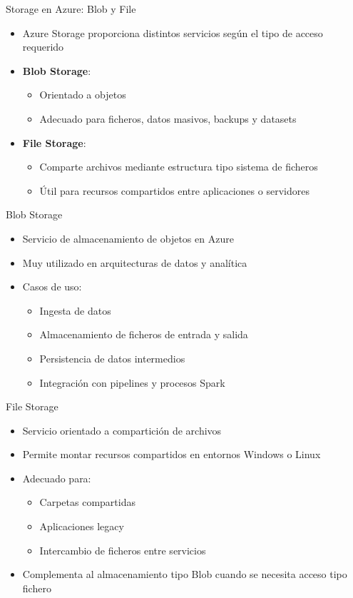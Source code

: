 \documentclass{beamer}
\begin{document}
\begin{frame}{Storage en Azure: Blob y File}
\begin{itemize}
    \item Azure Storage proporciona distintos servicios según el tipo de acceso requerido
    \item \textbf{Blob Storage}:
    \begin{itemize}
        \item Orientado a objetos
        \item Adecuado para ficheros, datos masivos, backups y datasets
    \end{itemize}
    \item \textbf{File Storage}:
    \begin{itemize}
        \item Comparte archivos mediante estructura tipo sistema de ficheros
        \item Útil para recursos compartidos entre aplicaciones o servidores
    \end{itemize}
\end{itemize}
\end{frame}

\begin{frame}{Blob Storage}
\begin{itemize}
    \item Servicio de almacenamiento de objetos en Azure
    \item Muy utilizado en arquitecturas de datos y analítica
    \item Casos de uso:
    \begin{itemize}
        \item Ingesta de datos
        \item Almacenamiento de ficheros de entrada y salida
        \item Persistencia de datos intermedios
        \item Integración con pipelines y procesos Spark
    \end{itemize}
\end{itemize}
\end{frame}

\begin{frame}{File Storage}
\begin{itemize}
    \item Servicio orientado a compartición de archivos
    \item Permite montar recursos compartidos en entornos Windows o Linux
    \item Adecuado para:
    \begin{itemize}
        \item Carpetas compartidas
        \item Aplicaciones legacy
        \item Intercambio de ficheros entre servicios
    \end{itemize}
    \item Complementa al almacenamiento tipo Blob cuando se necesita acceso tipo fichero
\end{itemize}
\end{frame}
\end{document}
